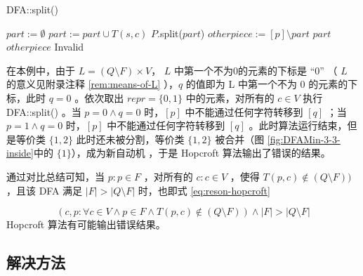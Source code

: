 \begin{algorithm}
    \caption{ DFA::split() }\label{al:split}
    \begin{algorithmic}[1]
         
            \Statex {}
            \State $part := \emptyset$ 
             
                    \State $part := part \cup T(s,c)$
                \EndIf
            \EndFor
                \State $P$.split($part$) 
                \State $otherpiece := [p] \setminus part$
                     {$part$}
                \Else
                     {$otherpiece$}
                \EndIf
            \Else
                 {Invalid}
            \EndIf
        \EndFunction
    \end{algorithmic}
\end{algorithm}

在本例中，由于 $L=(Q \setminus F) \times V$， $L$ 中第一个不为0的元素的下标是 “0” （ $L$ 的意义见附录注释 \ref{rem:means-of-L} ），$q$ 的值即为 L 中第一个不为 0 的元素的下标，此时 $q = 0$ 。依次取出 $repr = \{ 0,1 \}$ 中的元素，对所有的 $c \in V$ 执行 DFA::split() 。当 $p=0 \land q=0 $ 时，$[p]$ 中不能通过任何字符转移到 $[q]$ ；当 $p=1 \land q=0 $ 时，$[p]$ 中不能通过任何字符转移到 $[q]$ 。此时算法运行结束，但是等价类 $\{1,2 \}$ 此时还未被分割，等价类 $\{1,2 \}$ 被合并（图 \ref{fig:DFAMin-3-3-inside}中的 $\{ 1\}$），成为新自动机 ，于是 Hopcroft 算法输出了错误的结果。

通过对比总结可知，当 $p:p \in F$ ，对所有的 $c:c\in V$ ，使得 $ T(p,c) \notin (Q\setminus F) ) $，且该 DFA 满足 $|F| > |Q \setminus F| $ 时，也即式 \ref{eq:reson-hopcroft}

\begin{equation}\label{eq:reson-hopcroft} 
    (c,p: \forall c \in V \land p \in F \land T(p,c) \notin (Q\setminus F) ) \land |F| > |Q \setminus F| 
\end{equation}
Hopcroft 算法有可能输出错误结果。

\subsection{解决方法}\label{subsec:solve-hopcroft}

